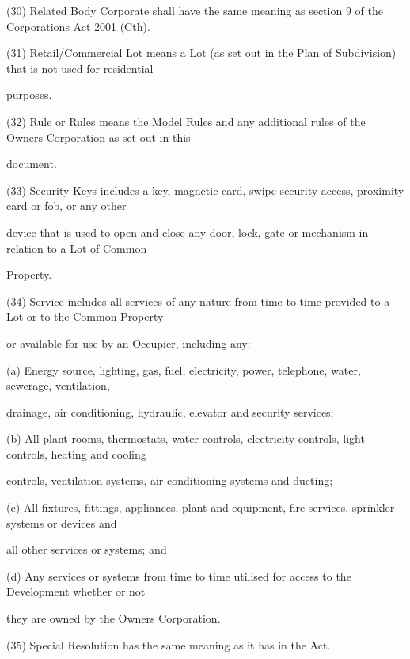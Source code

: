\documentclass{article}
\begin{document}
{\fontsize{9.962}{1}(30) Related Body Corporate shall have the same meaning as section 9 of the Corporations Act 2001 (Cth). }

{\fontsize{9.962}{1}(31) Retail/Commercial Lot means a Lot (as set out in the Plan of Subdivision) that is not used for residential }

{\fontsize{10.02}{1}purposes. }

{\fontsize{9.962}{1}(32) Rule or Rules means the Model Rules and any additional rules of the Owners Corporation as set out in this }

{\fontsize{10.02}{1}document. }

{\fontsize{9.962}{1}(33) Security Keys includes a key, magnetic card, swipe security access, proximity card or fob, or any other }

{\fontsize{10.02}{1}device that is used to open and close any door, lock, gate or mechanism in relation to a Lot of Common }

{\fontsize{10.02}{1}Property. }

{\fontsize{9.962}{1}(34) Service includes all services of any nature from time to time provided to a Lot or to the Common Property }

{\fontsize{10.02}{1}or available for use by an Occupier, including any: }

{\fontsize{9.962}{1}(a) Energy source, lighting, gas, fuel, electricity, power, telephone, water, sewerage, ventilation, }

{\fontsize{10.02}{1}drainage, air conditioning, hydraulic, elevator and security services; }

{\fontsize{9.962}{1}(b) All plant rooms, thermostats, water controls, electricity controls, light controls, heating and cooling }

{\fontsize{10.02}{1}controls, ventilation systems, air conditioning systems and ducting; }

{\fontsize{9.962}{1}(c) All fixtures, fittings, appliances, plant and equipment, fire services, sprinkler systems or devices and }

{\fontsize{10.02}{1}all other services or systems; and }

{\fontsize{9.962}{1}(d) Any services or systems from time to time utilised for access to the Development whether or not }

{\fontsize{10.02}{1}they are owned by the Owners Corporation. }

{\fontsize{9.962}{1}(35) Special Resolution has the same meaning as it has in the Act. }
\end{document}
